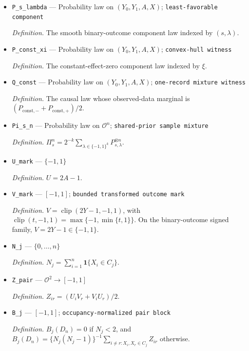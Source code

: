 \documentclass{article}
\begin{document}
\begin{itemize}
  \item \texttt{P\_\allowbreak{}s\_\allowbreak{}lambda} --- Probability law on \((Y_0,Y_1,A,X)\); \texttt{least-\allowbreak{}favorable component}
  \par\smallskip\noindent\emph{Definition.} The smooth binary-outcome component law indexed by \((s,\lambda)\).
  \item \texttt{P\_\allowbreak{}const\_\allowbreak{}xi} --- Probability law on \((Y_0,Y_1,A,X)\); \texttt{convex-\allowbreak{}hull witness}
  \par\smallskip\noindent\emph{Definition.} The constant-effect-zero component law indexed by \(\xi\).
  \item \texttt{Q\_\allowbreak{}const} --- Probability law on \((Y_0,Y_1,A,X)\); \texttt{one-\allowbreak{}record mixture witness}
  \par\smallskip\noindent\emph{Definition.} The causal law whose observed-data marginal is \((P_{\mathrm{const},-}+P_{\mathrm{const},+})/2\).
  \item \texttt{Pi\_\allowbreak{}s\_\allowbreak{}n} --- Probability law on \(\mathcal O^n\); \texttt{shared-\allowbreak{}prior sample mixture}
  \par\smallskip\noindent\emph{Definition.} \(\Pi_s^n=2^{-k}\sum_{\lambda\in\{-1,1\}^k}P_{s,\lambda}^{\otimes n}\).
  \item \texttt{U\_\allowbreak{}mark} --- \(\{-1,1\}\)
  \par\smallskip\noindent\emph{Definition.} \(U=2A-1\).
  \item \texttt{V\_\allowbreak{}mark} --- \([-1,1]\); \texttt{bounded transformed outcome mark}
  \par\smallskip\noindent\emph{Definition.} \(V=\operatorname{clip}(2Y-1,-1,1)\), with \(\operatorname{clip}(t,-1,1)=\max\{-1,\min\{t,1\}\}\). On the binary-outcome signed family, \(V=2Y-1\in\{-1,1\}\).
  \item \texttt{N\_\allowbreak{}j} --- \(\{0,\ldots,n\}\)
  \par\smallskip\noindent\emph{Definition.} \(N_j=\sum_{i=1}^n\mathbf 1\{X_i\in C_j\}\).
  \item \texttt{Z\_\allowbreak{}pair} --- \(\mathcal O^2\to[-1,1]\)
  \par\smallskip\noindent\emph{Definition.} \(Z_{ir}=(U_iV_r+V_iU_r)/2\).
  \item \texttt{B\_\allowbreak{}j} --- \([-1,1]\); \texttt{occupancy-\allowbreak{}normalized pair block}
  \par\smallskip\noindent\emph{Definition.} \(B_j(D_n)=0\) if \(N_j<2\), and \(B_j(D_n)=\{N_j(N_j-1)\}^{-1}\sum_{i\ne r:X_i,X_r\in C_j}Z_{ir}\) otherwise.

\end{itemize}
\end{document}
